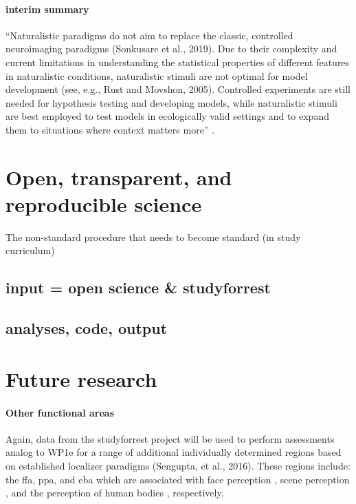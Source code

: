 \paragraph{interim summary}

``Naturalistic paradigms do not aim to replace the classic, controlled
neuroimaging paradigms (Sonkusare et al., 2019). Due to their complexity and
current limitations in understanding the statistical properties of different
features in naturalistic conditions, naturalistic stimuli are not optimal for
model development (see, e.g., Rust and Movshon, 2005). Controlled experiments
are still needed for hypothesis testing and developing models, while
naturalistic stimuli are best employed to test models in ecologically valid
settings and to expand them to situations where context matters
more'' \citep{saarimaki2021naturalistic}.



\section{Open, transparent, and reproducible science}

%
The non-standard procedure that needs to become standard (in study curriculum)

\subsection{input = open science \& studyforrest}

\subsection{analyses, code, output}



\section{Future research}

\paragraph{Other functional areas}

Again, data from the studyforrest project will be used to perform assessments
analog to WP1e for a range of additional individually determined regions based
on established localizer paradigms (Sengupta, et al., 2016).
%
These regions include: the \ac{ffa}, \ac{ppa}, and \ac{eba}  which are
associated with face perception \citep{kanwisher1997ffa,
pitcher2011occipitalfacearea}, scene perception \citep{epstein1998ppa}, and the
perception of human bodies \citep{downing2001bodyarea}, respectively.


